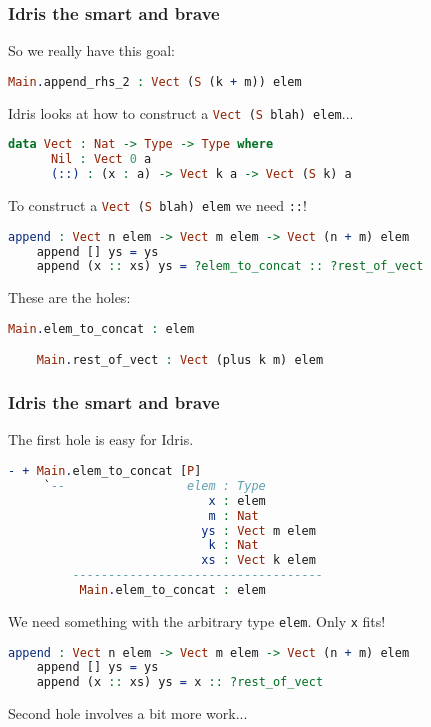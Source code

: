 \documentclass{beamer}
\begin{document}
\begin{frame}[fragile]
  \frametitle{Idris the smart and brave}

  So we really have this goal:

  \begin{lstlisting}[language=Idris]
    Main.append_rhs_2 : Vect (S (k + m)) elem
  \end{lstlisting}

  \pause

  Idris looks at how to construct a \lstinline[language=Idris,columns=fixed]{Vect (S blah) elem}...

  \pause

  \begin{lstlisting}[language=Idris]
    data Vect : Nat -> Type -> Type where
      Nil : Vect 0 a
      (::) : (x : a) -> Vect k a -> Vect (S k) a
  \end{lstlisting}

  \pause
  To construct a \lstinline[language=Idris,columns=fixed]{Vect (S blah) elem} we need \texttt{::}!

  \pause
  \begin{lstlisting}[language=Idris]
    append : Vect n elem -> Vect m elem -> Vect (n + m) elem
    append [] ys = ys
    append (x :: xs) ys = ?elem_to_concat :: ?rest_of_vect
  \end{lstlisting}

  \pause
  These are the holes:

  \begin{lstlisting}[language=Idris]
    Main.elem_to_concat : elem

    Main.rest_of_vect : Vect (plus k m) elem
  \end{lstlisting}
\end{frame}

\begin{frame}[fragile]
  \frametitle{Idris the smart and brave}  
  The first hole is easy for Idris.

  \begin{lstlisting}[language=Idris]
    - + Main.elem_to_concat [P]
     `--                 elem : Type
                            x : elem
                            m : Nat
                           ys : Vect m elem
                            k : Nat
                           xs : Vect k elem
         -----------------------------------
          Main.elem_to_concat : elem
  \end{lstlisting}

  \pause
  We need something with the arbitrary type \texttt{elem}. Only \texttt{x} fits!

  \pause

  \begin{lstlisting}[language=Idris]
    append : Vect n elem -> Vect m elem -> Vect (n + m) elem
    append [] ys = ys
    append (x :: xs) ys = x :: ?rest_of_vect
  \end{lstlisting}

  \pause

  Second hole involves a bit more work...
\end{frame}
\end{document}
